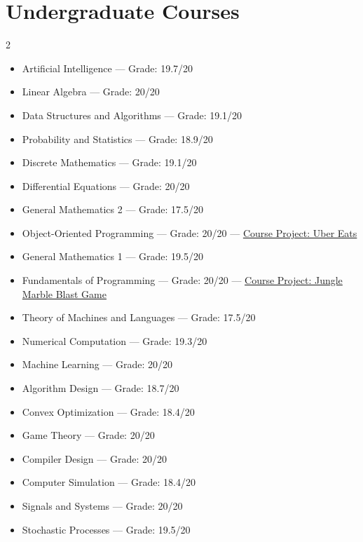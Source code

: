 \documentclass[letterpaper,11pt]{article}
\begin{document}
\section{Undergraduate Courses}
\vspace{-2pt}
\setlength{\multicolsep}{4pt}
\begin{multicols}{2}
\begin{itemize}[leftmargin=0.18in,itemsep=0pt,topsep=0pt,parsep=0pt,partopsep=0pt]
  \small
  \item Artificial Intelligence --- Grade: 19.7/20
  \item Linear Algebra --- Grade: 20/20
  \item Data Structures and Algorithms --- Grade: 19.1/20
  \item Probability and Statistics --- Grade: 18.9/20
  \item Discrete Mathematics --- Grade: 19.1/20
  \item Differential Equations --- Grade: 20/20
  \item General Mathematics 2 --- Grade: 17.5/20
  \item Object-Oriented Programming --- Grade: 20/20 --- \href{https://github.com/Donya-Jafari/OOP_project}{Course Project: Uber Eats}
  \item General Mathematics 1 --- Grade: 19.5/20
  \columnbreak
  \item Fundamentals of Programming --- Grade: 20/20 --- \href{https://github.com/Donya-Jafari/JungleMarbleBlast_SDL}{Course Project: Jungle Marble Blast Game}
  \item Theory of Machines and Languages --- Grade: 17.5/20
  \item Numerical Computation --- Grade: 19.3/20
  \item Machine Learning --- Grade: 20/20
  \item Algorithm Design --- Grade: 18.7/20
  \item Convex Optimization --- Grade: 18.4/20
  \item Game Theory --- Grade: 20/20
  \item Compiler Design --- Grade: 20/20
  \item Computer Simulation --- Grade: 18.4/20
  \item Signals and Systems --- Grade: 20/20
  \item Stochastic Processes --- Grade: 19.5/20
\end{itemize}
\end{multicols}
\vspace{-2pt}
\end{document}
